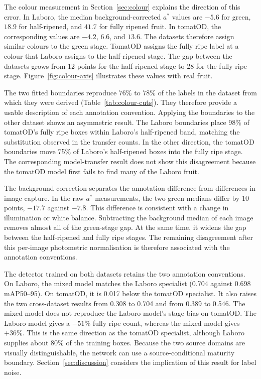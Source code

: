 The colour measurement in Section~\ref{sec:colour} explains the direction of
this error. In Laboro, the median background-corrected $a^*$ values are $-5.6$
for green, $18.9$ for half-ripened, and $41.7$ for fully ripened fruit. In
tomatOD, the corresponding values are $-4.2$, $6.6$, and $13.6$. The datasets
therefore assign similar colours to the green stage. TomatOD assigns the fully
ripe label at a colour that Laboro assigns to the half-ripened stage. The gap
between the datasets grows from 12 points for the half-ripened stage to 28 for
the fully ripe stage. Figure~\ref{fig:colour-axis} illustrates these values with
real fruit.

The two fitted boundaries reproduce 76\% to 78\% of the labels in the dataset
from which they were derived (Table~\ref{tab:colour-cuts}). They therefore
provide a usable description of each annotation convention. Applying the
boundaries to the other dataset shows an asymmetric result. The Laboro
boundaries place 98\% of tomatOD's fully ripe boxes within Laboro's
half-ripened band, matching the substitution observed in the transfer counts.
In the other direction, the tomatOD boundaries move 75\% of Laboro's
half-ripened boxes into the fully ripe stage. The corresponding model-transfer
result does not show this disagreement because the tomatOD model first fails to
find many of the Laboro fruit.

The background correction separates the annotation difference from differences
in image capture. In the raw $a^*$ measurements, the two green medians differ by
10 points, $-17.7$ against $-7.8$. This difference is consistent with a change
in illumination or white balance. Subtracting the background median of each
image removes almost all of the green-stage gap. At the same time, it widens the
gap between the half-ripened and fully ripe stages. The remaining disagreement
after this per-image photometric normalisation is therefore associated with the
annotation conventions.

The detector trained on both datasets retains the two annotation conventions.
On Laboro, the mixed model matches the Laboro specialist (0.704 against 0.698
mAP50--95). On tomatOD, it is 0.017 below the tomatOD specialist. It also raises
the two cross-dataset results from 0.308 to 0.704 and from 0.389 to
0.546. The mixed model does not reproduce the Laboro model's stage bias on
tomatOD. The Laboro model gives a $-51\%$ fully ripe count, whereas the mixed
model gives $+36\%$. This is the same direction as the tomatOD specialist,
although Laboro supplies about 80\% of the training boxes. Because the two
source domains are visually distinguishable, the network can use a
source-conditional maturity boundary. Section~\ref{sec:discussion} considers
the implication of this result for label noise.

